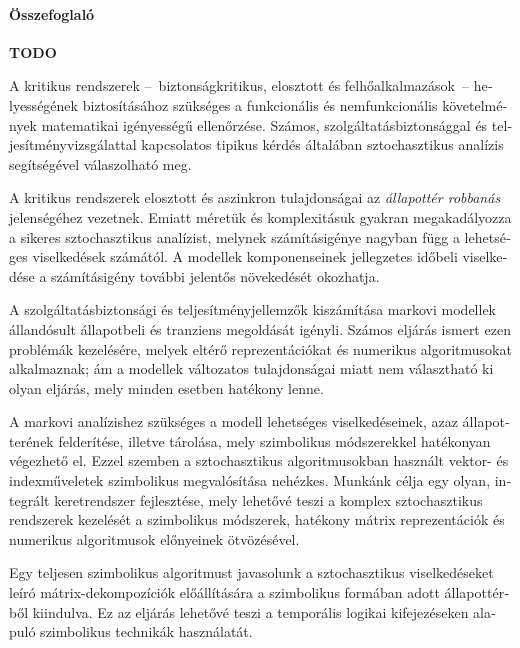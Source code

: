 \begin{otherlanguage}{magyar}

  \paragraph*{Összefoglaló}
  \thispagestyle{plain}

  \textbf{TODO}

  A kritikus rendszerek --~biztonságkritikus,
  elosztott és felhőalkalmazások~-- helyességének
  biztosításához szükséges a funkcionális és nemfunkcionális
  követelmények matematikai igényességű ellenőrzése. Számos,
  szolgáltatásbiztonsággal és teljesítményvizsgálattal kapcsolatos
  tipikus kérdés általában sztochasztikus analízis segítségével
  válaszolható meg.

  A kritikus rendszerek elosztott és aszinkron tulajdonságai az
  \emph{állapottér robbanás} jelenségéhez vezetnek. Emiatt méretük és
  komplexitásuk gyakran megakadályozza a sikeres sztochasztikus
  analízist, melynek számításigénye nagyban függ a lehetséges
  viselkedések számától. A modellek komponenseinek jellegzetes időbeli
  viselkedése a számításigény további jelentős növekedését okozhatja.

  A szolgáltatásbiztonsági és teljesítményjellemzők kiszámítása
  markovi modellek állandósult állapotbeli és tranziens megoldását
  igényli. Számos eljárás ismert ezen problémák kezelésére, melyek
  eltérő reprezentációkat és numerikus algoritmusokat alkalmaznak; ám
  a modellek változatos tulajdonságai miatt nem választható ki olyan
  eljárás, mely minden esetben hatékony lenne.

  A markovi analízishez szükséges a modell lehetséges viselkedéseinek,
  azaz állapotterének felderítése, illetve tárolása, mely szimbolikus
  módszerekkel hatékonyan végezhető el. Ezzel szemben a sztochasztikus
  algoritmusokban használt vektor- és indexműveletek szimbolikus
  megvalósítása nehézkes. Munkánk célja egy olyan, integrált
  keretrendszer fejlesztése, mely lehetővé teszi a komplex
  sztochasztikus rendszerek kezelését a szimbolikus módszerek,
  hatékony mátrix reprezentációk és numerikus algoritmusok előnyeinek
  ötvözésével.

  Egy teljesen szimbolikus algoritmust javasolunk a sztochasztikus
  viselkedéseket leíró mátrix-dekompozíciók előállítására a
  szimbolikus formában adott állapottérből kiindulva. Ez az eljárás
  lehetővé teszi a temporális logikai kifejezéseken alapuló
  szimbolikus technikák használatát.


\end{otherlanguage}
